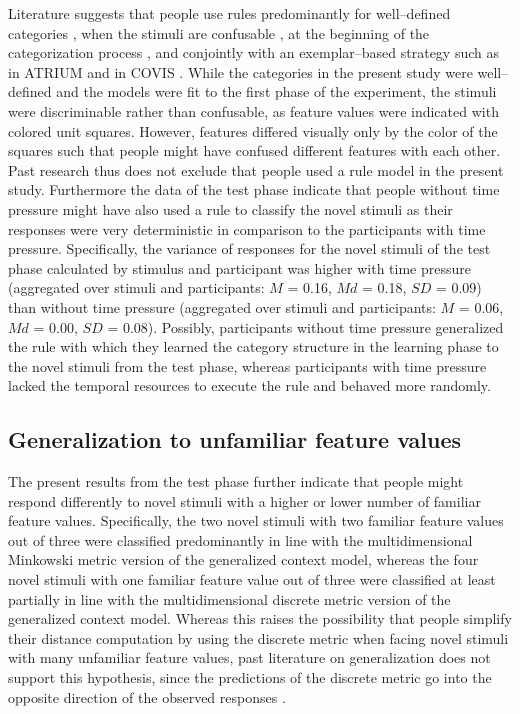 \documentclass[a4paper,man,natbib]{apa6}
\begin{document}
Literature suggests that people use rules predominantly for well--defined categories \citep{restle1962selection, tom1968attention}, when the stimuli are confusable \citep{rouder2006comparing}, at the beginning of the categorization process \citep{rouder2006comparing}, and conjointly with an exemplar--based strategy such as in ATRIUM \citep{erickson1998rules} and in COVIS \citep{ashby2011covis}. While the categories in the present study were well--defined and the models were fit to the first phase of the experiment, the stimuli were discriminable rather than confusable, as feature values were indicated with colored unit squares. However, features differed visually only by the color of the squares such that people might have confused different features with each other. 
Past research thus does not exclude that people used a rule model in the present study. Furthermore the data of the test phase indicate that people without time pressure might have also used a rule to classify the novel stimuli as their responses were very deterministic in comparison to the participants with time pressure. Specifically, the variance of responses for the novel stimuli of the test phase calculated by stimulus and participant was higher with time pressure (aggregated over stimuli and participants: $M$ = 0.16, $Md$ = 0.18, $SD$ = 0.09) than without time pressure (aggregated over stimuli and participants: $M$ = 0.06, $Md$ = 0.00, $SD$ = 0.08). Possibly, participants without time pressure generalized the rule with which they learned the category structure in the learning phase to the novel stimuli from the test phase, whereas participants with time pressure lacked the temporal resources to execute the rule and behaved more randomly.

\subsection{Generalization to unfamiliar feature values}
The present results from the test phase further indicate that people might respond differently to novel stimuli with a higher or lower number of familiar feature values. Specifically, the two novel stimuli with two familiar feature values out of three were classified predominantly in line with the multidimensional Minkowski metric version of the generalized context model, whereas the four novel stimuli with one familiar feature value out of three were classified at least partially in line with the multidimensional discrete metric version of the generalized context model. Whereas this raises the possibility that people simplify their distance computation by using the discrete metric when facing novel stimuli with many unfamiliar feature values, past literature on generalization does not support this hypothesis, since the predictions of the discrete metric go into the opposite direction of the observed responses \citep{erickson2002rule, denton2008rule}.
\end{document}
